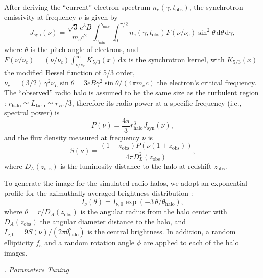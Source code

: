 \documentclass[modern]{aastex62}
\newcommand{\R}[1]{\mathrm{#1}}
\newcommand{\D}[1]{\R{d} #1}
\newcounter{sssseccount}
\newcommand{\sssseclabel}{\alph{sssseccount}}
\newcommand{\ssssec}[1]{%
  \vspace{1ex}%
  \stepcounter{sssseccount}%
  \noindent\emph{\sssseclabel. #1}%
}
\begin{document}
After deriving the \enquote{current} electron spectrum
$n_e(\gamma, t_{\R{obs}})$, the synchrotron emissivity at frequency
$\nu$ is given by \citep{rybicki1979}
\begin{equation}
  \label{sec:jnu-sync}
  J_{\R{syn}}(\nu) = \frac{\sqrt{3} \, e^3 B}{m_e c^2}
    \int_{\gamma_{\R{min}}}^{\gamma_{\R{max}}} \!\!\int_0^{\pi/2}
    n_e(\gamma, t_{\R{obs}}) F(\nu/\nu_c)
    \sin^2 \!\theta \,\D{\theta} \,\D{\gamma},
\end{equation}
where $\theta$ is the pitch angle of electrons,
and $F(\nu/\nu_c) = (\nu/\nu_c) \int_{\nu/\nu_c}^{\infty} K_{5/3}(x) \,\D{x}$
is the synchrotron kernel,
with $K_{5/3}(x)$ the modified Bessel function of 5/3 order,
$\nu_c = (3/2) \,\gamma^2 \nu_L \sin\theta
= 3 e B \gamma^2 \sin\theta / (4\pi m_e c)$
the electron's critical frequency.
The \enquote{observed} radio halo is assumed to be the same size as
the turbulent region \citep[e.g.,][]{vazza2011}:
$r_{\R{halo}} \simeq L_{\R{turb}} \simeq r_{\R{vir}}/3$,
therefore its radio power at a specific frequency (i.e., spectral power) is
\begin{equation}
  \label{eq:halo-power}
  P(\nu) = \frac{4\pi}{3} r_{\R{halo}}^3 J_{\R{syn}}(\nu),
\end{equation}
and the flux density measured at frequency $\nu$ is \citep[e.g.,][]{hogg1999}
\begin{equation}
  \label{eq:halo-flux}
  S(\nu) = \frac{(1+z_{\R{obs}}) P(\nu(1+z_{\R{obs}}))}{4\pi D_{\!L}^2(z_{\R{obs}})},
\end{equation}
where $D_{\!L}(z_{\R{obs}})$ is the luminosity distance to the halo at
redshift $z_{\R{obs}}$.

To generate the image for the simulated radio halos, we adopt an exponential
profile for the azimuthally averaged brightness distribution \citep{murgia2009}:
\begin{equation}
  \label{eq:halo-profile}
  I_{\nu}(\theta) = I_{\nu,0} \exp(-3 \,\theta / \theta_{\R{halo}}),
\end{equation}
where $\theta = r / D_{\!A}(z_{\R{obs}})$ is the angular radius from the halo
center with $D_{\!A}(z_{\R{obs}})$ the angular diameter distance to the halo,
and $I_{\nu,0} = 9 S(\nu) / (2\pi \theta^2_{\R{halo}})$ is the central
brightness.
In addition, a random ellipticity $f_e$ and a random rotation angle
$\phi$ are applied to each of the halo images.

\ssssec{Parameters Tuning}
\end{document}
